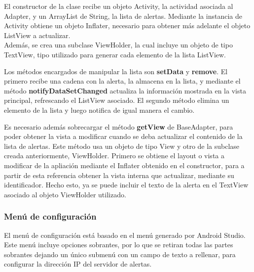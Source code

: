         El constructor de la clase recibe un objeto Activity, la actividad asociada al Adapter, y un ArrayList de String, la lista de alertas. Mediante la instancia de Activity obtiene un objeto Inflater, necesario para obtener más adelante el objeto ListView a actualizar. \\

        Además, se crea una subclase ViewHolder, la cual incluye un objeto de tipo TextView, tipo utilizado para generar cada elemento de la lista ListView. \\

        \vspace{0.3cm}

        Los métodos encargados de manipular la lista son \textbf{setData} y \textbf{remove}. El primero recibe una cadena con la alerta, la almacena en la lista, y mediante el método \textbf{notifyDataSetChanged} actualiza la información mostrada en la vista principal, refrescando el ListView asociado. El segundo método elimina un elemento de la lista y luego notifica de igual manera el cambio. \\

        \vspace{0.3cm}

        Es necesario además sobrecargar el método \textbf{getView} de BaseAdapter, para poder obtener la vista a modificar cuando se deba actualizar el contenido de la lista de alertas. Este método usa un objeto de tipo View y otro de la subclase creada anteriormente, ViewHolder. Primero se obtiene el layout o vista a modificar de la apliación mediante el Inflater obtenido en el constructor, para a partir de esta referencia obtener la vista interna que actualizar, mediante su identificador. Hecho esto, ya se puede incluir el texto de la alerta en el TextView asociado al objeto ViewHolder utilizado.

        \subsubsection{Menú de configuración}
        \label{sec:menuapp}

        El menú de configuración está basado en el menú generado por Android Studio. Este menú incluye opciones sobrantes, por lo que se retiran todas las partes sobrantes dejando un único submenú con un campo de texto a rellenar, para configurar la dirección IP del servidor de alertas. \\

